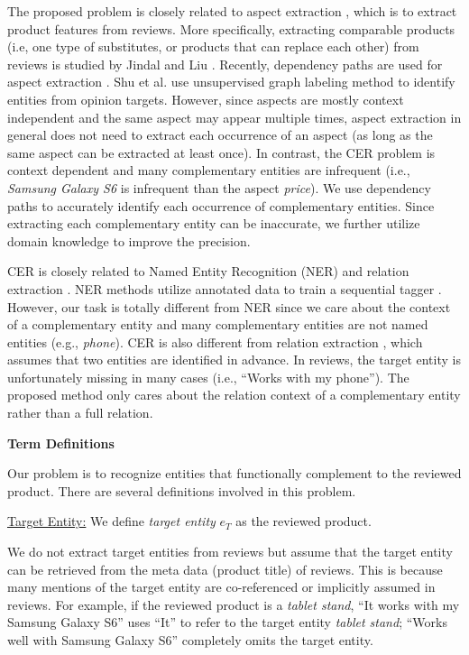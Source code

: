 The proposed problem is closely related to aspect extraction \cite{hu2004mining,popescu2007extracting,qiu2011opinion,liu2015sentiment}, which is to extract product features from reviews. More specifically, extracting comparable products (i.e, one type of substitutes, or products that can replace each other) from reviews is studied by Jindal and Liu \cite{jindal2006mining}. Recently, dependency paths \cite{kubler2009dependency} are used for aspect extraction \cite{qiu2011opinion,liu2015automated}. Shu et al. \cite{shu2016lifelong} use unsupervised graph labeling method to identify entities from opinion targets. However, since aspects are mostly context independent and the same aspect may appear multiple times, aspect extraction in general does not need to extract each occurrence of an aspect (as long as the same aspect can be extracted at least once). In contrast, the CER problem is context dependent and many complementary entities are infrequent (i.e., \textit{Samsung Galaxy S6} is infrequent than the aspect \textit{price}). We use dependency paths to accurately identify each occurrence of complementary entities. Since extracting each complementary entity can be inaccurate, we further utilize domain knowledge to improve the precision. 

CER is closely related to Named Entity Recognition (NER)\cite{nadeau2007survey} and relation extraction \cite{bach2007review}. NER methods utilize annotated data to train a sequential tagger \cite{rabiner1986introduction,mccallum2000maximum}. However, our task is totally different from NER since we care about the context of a complementary entity and many complementary entities are not named entities (e.g., \textit{phone}). CER is also different from relation extraction \cite{bach2007review,culotta2004dependency,mintz2009distant,bunescu2005shortest}, which assumes that two entities are identified in advance. In reviews, the target entity is unfortunately missing in many cases (i.e., ``Works with my phone''). The proposed method only cares about the relation context of a complementary entity rather than a full relation.

\textbf{Term Definitions}
\label{sec:prelim}

Our problem is to recognize entities that functionally complement to the reviewed product. There are several definitions involved in this problem.

\underline{Target Entity:} \label{defn:te}
We define \emph{target entity} $e_T$ as the reviewed product.

We do not extract target entities from reviews but assume that the target entity can be retrieved from the meta data (product title) of reviews. This is because many mentions of the target entity are co-referenced or implicitly assumed in reviews. For example, if the reviewed product is a \textit{tablet stand}, ``It works with my Samsung Galaxy S6'' uses ``It'' to refer to the target entity \textit{tablet stand}; ``Works well with Samsung Galaxy S6'' completely omits the target entity.

